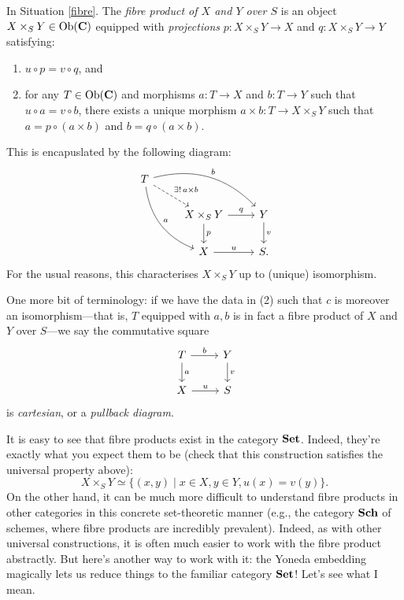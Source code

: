 \begin{definition}
In Situation \ref{fibre}. The \textit{fibre product of $X$ and $Y$
  over $S$} is an object $X \times_S Y \in \operatorname{Ob}(\mathbf{C})$ equipped with
\textit{projections} $p : X \times_S Y \to X$ and $q : X \times_S Y
\to Y$ satisfying:
\begin{enumerate}
\item $u \circ p = v \circ q$, and
\item for any $T \in \operatorname{Ob}(\mathbf{C})$ and morphisms $a : T \to X$ and $b : T
  \to Y$ such that $u \circ a = v \circ b$, there exists a unique
  morphism $a \times b : T \to X \times_S Y$ such that $a = p \circ (a
  \times b)$ and $b = q \circ (a \times b)$.
\end{enumerate}
This is encapuslated by the following diagram:
\[
\begin{tikzcd}
  T \ar[bend left]{rrd}{b} \ar[bend right]{ddr}{a}
  \ar[dashed]{dr}{\exists!\, a \times b} & & \\ & X \times_S Y \rar{q}
  \dar{p} & Y \dar{v} \\ & X \rar{u} & S.
\end{tikzcd}
\]
For the usual reasons, this characterises $X \times_S Y$ up to
(unique) isomorphism.

One more bit of terminology: if we have the data in (2) such that $c$
is moreover an isomorphism---that is, $T$ equipped with $a,b$ is in
fact a fibre product of $X$ and $Y$ over $S$---we say the commutative
square
\[
\begin{tikzcd}
  T \rar{b} \dar{a} & Y \dar{v} \\ X \rar{u} & S
\end{tikzcd}
\]
is \textit{cartesian}, or a \textit{pullback diagram}.
\end{definition}

\begin{example}
  It is easy to see that fibre products exist in the category
  $\mathbf{Set}$. Indeed, they're exactly what you expect them to be (check
  that this construction satisfies the universal property above):
  \[
  X \times_S Y \simeq \{(x, y) \mid x \in X, y \in Y, u(x) = v(y)\}.
  \]
  On the other hand, it can be much more difficult to understand fibre
  products in other categories in this concrete set-theoretic manner
  (e.g., the category $\mathbf{Sch}$ of schemes, where fibre products are
  incredibly prevalent). Indeed, as with other universal
  constructions, it is often much easier to work with the fibre
  product abstractly. But here's another way to work with it: the
  Yoneda embedding magically lets us reduce things to the familiar
  category $\mathbf{Set}$!  Let's see what I mean.
\end{example}

